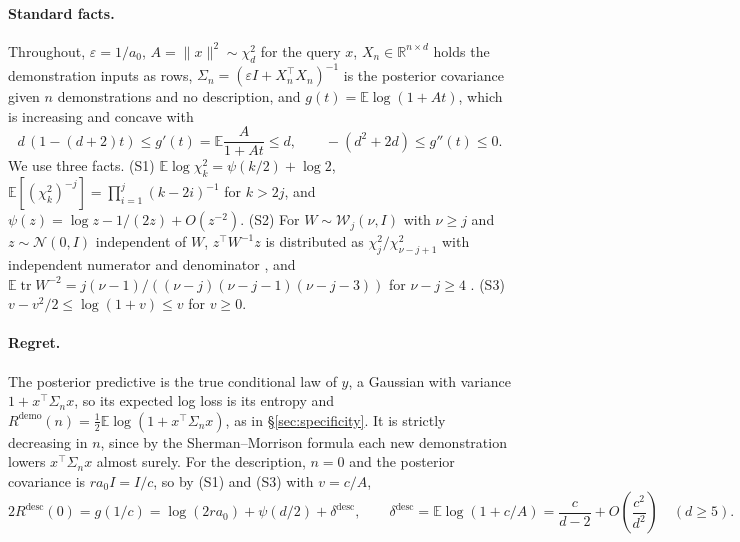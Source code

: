 \documentclass{article}
\newcommand{\E}{\mathbb{E}}
\newcommand{\R}{\mathbb{R}}
\begin{document}
\paragraph{Standard facts.}
Throughout, $\varepsilon = 1/a_0$, $A = \|x\|^2 \sim \chi^2_d$ for the query $x$, $X_n \in \R^{n \times d}$ holds the demonstration inputs as rows, $\Sigma_n = (\varepsilon I + X_n^\top X_n)^{-1}$ is the posterior covariance given $n$ demonstrations and no description, and $g(t) = \E \log(1 + At)$, which is increasing and concave with
\begin{equation}\label{eq:g-derivs}
d\,(1 - (d+2)t) \le g'(t) = \E \frac{A}{1 + At} \le d,
\qquad
-(d^2 + 2d) \le g''(t) \le 0 .
\end{equation}
We use three facts. (S1) $\E \log \chi^2_k = \psi(k/2) + \log 2$, $\E[(\chi^2_k)^{-j}] = \prod_{i=1}^{j} (k - 2i)^{-1}$ for $k > 2j$, and $\psi(z) = \log z - 1/(2z) + O(z^{-2})$. (S2) For $W \sim \mathcal{W}_j(\nu, I)$ with $\nu \ge j$ and $z \sim \mathcal{N}(0, I)$ independent of $W$, $z^\top W^{-1} z$ is distributed as $\chi^2_j / \chi^2_{\nu-j+1}$ with independent numerator and denominator \citep[Theorem~3.2.12]{muirhead1982}, and $\E \operatorname{tr} W^{-2} = j(\nu-1)/((\nu-j)(\nu-j-1)(\nu-j-3))$ for $\nu - j \ge 4$ \citep{vonrosen1988}. (S3) $v - v^2/2 \le \log(1 + v) \le v$ for $v \ge 0$.

\paragraph{Regret.}
The posterior predictive is the true conditional law of $y$, a Gaussian with variance $1 + x^\top \Sigma_n x$, so its expected log loss is its entropy and $R^{\mathrm{demo}}(n) = \tfrac12 \E \log(1 + x^\top \Sigma_n x)$, as in \S\ref{sec:specificity}. It is strictly decreasing in $n$, since by the Sherman--Morrison formula each new demonstration lowers $x^\top \Sigma_n x$ almost surely. For the description, $n = 0$ and the posterior covariance is $r a_0 I = I/c$, so by (S1) and (S3) with $v = c/A$,
\begin{equation}\label{eq:rdesc}
2R^{\mathrm{desc}}(0) = g(1/c) = \log(2 r a_0) + \psi(d/2) + \delta^{\mathrm{desc}},
\qquad
\delta^{\mathrm{desc}} = \E \log(1 + c/A) = \frac{c}{d-2} + O\!\left(\frac{c^2}{d^2}\right) \quad (d \ge 5).
\end{equation}
\end{document}
